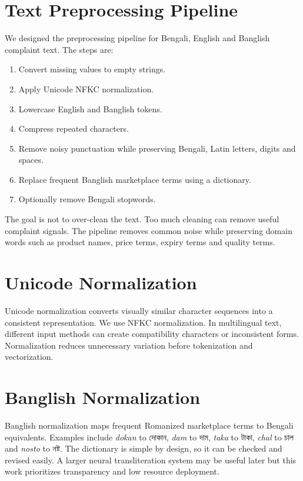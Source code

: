 \documentclass[12pt,a4paper,openany]{book}
\newcommand{\bn}[1]{{\banglafont #1}}
\newcommand{\bn}[1]{#1}
\begin{document}
\section{Text Preprocessing Pipeline}
We designed the preprocessing pipeline for Bengali, English and Banglish complaint text. The steps are:
\begin{enumerate}
  \item Convert missing values to empty strings.
  \item Apply Unicode NFKC normalization.
  \item Lowercase English and Banglish tokens.
  \item Compress repeated characters.
  \item Remove noisy punctuation while preserving Bengali, Latin letters, digits and spaces.
  \item Replace frequent Banglish marketplace terms using a dictionary.
  \item Optionally remove Bengali stopwords.
\end{enumerate}

The goal is not to over-clean the text. Too much cleaning can remove useful complaint signals. The pipeline removes common noise while preserving domain words such as product names, price terms, expiry terms and quality terms.

\section{Unicode Normalization}
Unicode normalization converts visually similar character sequences into a consistent representation. We use NFKC normalization. In multilingual text, different input methods can create compatibility characters or inconsistent forms. Normalization reduces unnecessary variation before tokenization and vectorization.

\section{Banglish Normalization}
Banglish normalization maps frequent Romanized marketplace terms to Bengali equivalents. Examples include \textit{dokan} to \bn{দোকান}, \textit{dam} to \bn{দাম}, \textit{taka} to \bn{টাকা}, \textit{chal} to \bn{চাল} and \textit{nosto} to \bn{নষ্ট}. The dictionary is simple by design, so it can be checked and revised easily. A larger neural transliteration system may be useful later but this work prioritizes transparency and low resource deployment.
\end{document}
